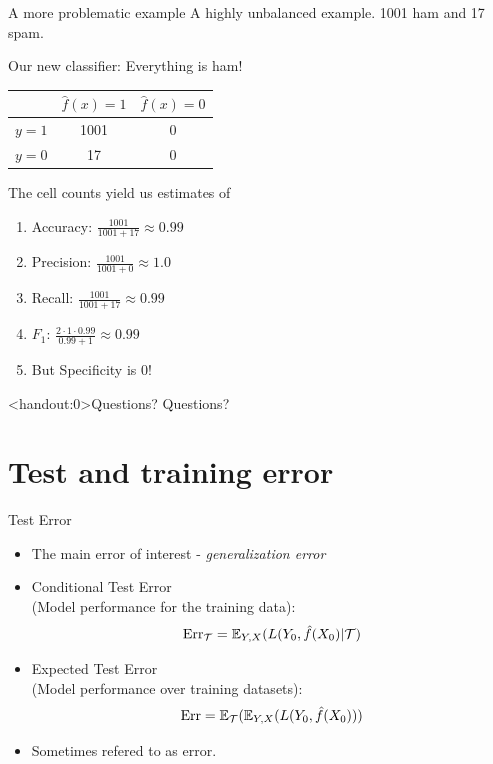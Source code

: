 \documentclass[10pt]{beamer}
\begin{document}
\begin{frame}{A more problematic example}
A highly unbalanced example. 1001 ham and 17 spam.

Our new classifier: Everything is ham!\pause

\begin{center}
\begin{tabular}{ l | c | c }
  & $\hat{f}(x)=1$ & $\hat{f}(x)=0$\\
  \hline
  $y=1$ & 1001 & 0 \\
  $y=0$ & 17 & 0 \\
  \hline
\end{tabular}
\end{center}
\pause
The cell counts yield us estimates of
\begin{enumerate}
\item Accuracy: $\frac{1001}{1001+17}\approx 0.99$
\item Precision: $\frac{1001}{1001+0}\approx 1.0$
\item Recall: $\frac{1001}{1001+17}\approx 0.99$
\item $F_1$: $\frac{2 \cdot 1 \cdot 0.99}{0.99 + 1}\approx 0.99$
\item But Specificity is 0!
\end{enumerate}

\end{frame}




\begin{frame}<handout:0>{Questions?}
Questions?
\end{frame}



\section{Test and training error}
\frame{\sectionpage}

\begin{frame}{Test Error}

\begin{itemize}
\item The main error of interest - \emph{generalization error}
\item Conditional Test Error \\(Model performance for the  training data):
\[
\text{Err}_\mathcal{T} = \operatorname{\mathbb{E}}_{Y,X}(L(Y_0,\hat{f}(X_0) | \mathcal{T})
\]
\item Expected Test Error \\(Model performance over  training datasets):
\[
\text{Err} = \operatorname{\mathbb{E}}_\mathcal{T}(\operatorname{\mathbb{E}}_{Y,X}(L(Y_0,\hat{f}(X_0)))
\]
\item Sometimes refered to as  error.

\end{itemize}

\end{frame}
\end{document}
